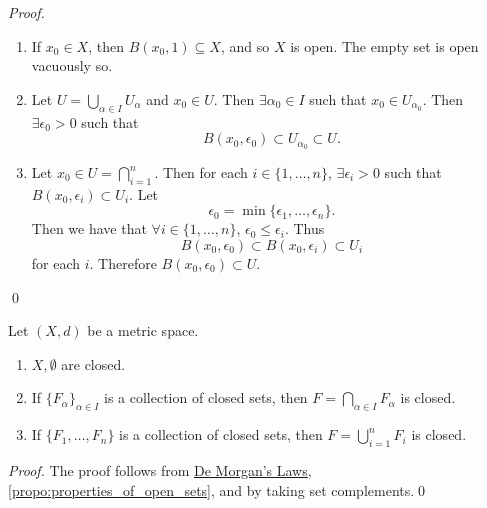 \documentclass[notoc,notitlepage]{tufte-book}
\begin{document}
\begin{proof}
  \begin{enumerate}
    \item If $x_0 \in X$, then $B(x_0, 1) \subseteq X$, and so $X$ is open. The empty set is open vacuously so.
    \item Let $U = \bigcup_{\alpha \in I} U_\alpha$ and $x_0 \in U$. Then $\exists \alpha_0 \in I$ such that $x_0 \in U_{\alpha_0}$. Then $\exists \epsilon_0 > 0$ such that
      \begin{equation*}
        B(x_0, \epsilon_0) \subset U_{\alpha_0} \subset U.
      \end{equation*}
    \item Let $x_0 \in U = \bigcap_{i = 1}^{n}$. Then for each $i \in \{1, \ldots, n\}$, $\exists \epsilon_i > 0$ such that $B(x_0, \epsilon_i) \subset U_i$. Let
      \begin{equation*}
        \epsilon_0 = \min \{ \epsilon_1, \ldots, \epsilon_n \}.
      \end{equation*}
      Then we have that $\forall i \in \{1, \ldots, n\}$, $\epsilon_0 \leq \epsilon_i$. Thus
      \begin{equation*}
        B(x_0, \epsilon_0) \subset B(x_0, \epsilon_i) \subset U_i
      \end{equation*}
      for each $i$. Therefore $B(x_0, \epsilon_0) \subset U$.
  \end{enumerate}\qed
\end{proof}

\begin{crly}\label{crly:properties_of_closed_sets}
  Let $(X, d)$ be a metric space.
  \begin{enumerate}
    \item $X, \emptyset$ are closed.
    \item If $\{ F_\alpha \}_{\alpha \in I}$ is a collection of closed sets, then $F = \bigcap_{\alpha \in I} F_\alpha$ is closed.
    \item If $\{ F_1, \ldots, F_n \}$ is a collection of closed sets, then $F = \bigcup_{i = 1}^{n} F_i$ is closed.
  \end{enumerate}
\end{crly}

\begin{proof}
  The proof follows from \hyperref[thm:de_morgan_s_laws]{De Morgan's Laws}, \cref{propo:properties_of_open_sets}, and by taking set complements.\qed
\end{proof}
\end{document}
